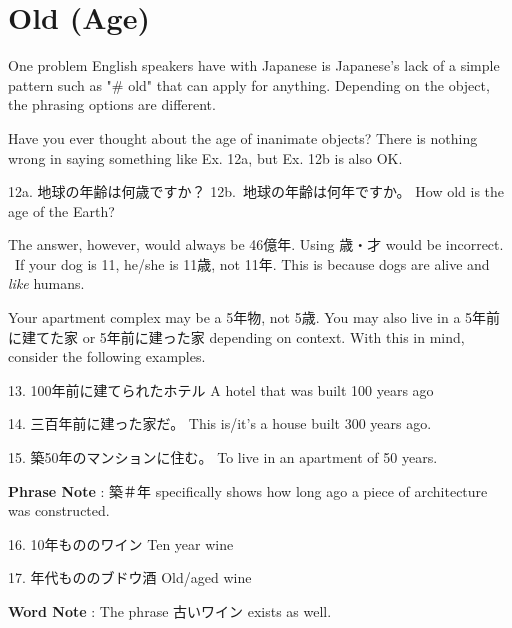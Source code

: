 \section{Old (Age)}
 
\par{ One problem English speakers have with Japanese is Japanese's lack of a simple pattern such as "\# old" that can apply for anything. Depending on the object, the phrasing options are different. }

\par{ Have you ever thought about the age of inanimate objects? There is nothing wrong in saying something like Ex. 12a, but Ex. 12b is also OK. }

\par{12a. 地球の年齢は何歳ですか？ \hfill\break
12b. 地球の年齢は何年ですか。 \hfill\break
How old is the age of the Earth? }

\par{ The answer, however, would always be 46億年. Using 歳・才 would be incorrect.  If your dog is 11, he\slash she is 11歳, not 11年. This is because dogs are alive and \emph{like }humans. }

\par{ Your apartment complex may be a 5年物, not 5歳. You may also live in a 5年前に建てた家 or 5年前に建った家 depending on context. With this in mind, consider the following examples. }

\par{13. 100年前に建てられたホテル \hfill\break
A hotel that was built 100 years ago }

\par{14. 三百年前に建った家だ。 \hfill\break
This is\slash it's a house built 300 years ago. }

\par{15. 築50年のマンションに住む。 \hfill\break
To live in an apartment of 50 years. }

\par{\textbf{Phrase Note }: 築＃年 specifically shows how long ago a piece of architecture was constructed. }

\par{16. 10年もののワイン \hfill\break
Ten year wine }

\par{17. 年代もののブドウ酒 \hfill\break
Old\slash aged wine }

\par{\textbf{Word Note }: The phrase 古いワイン exists as well. }


